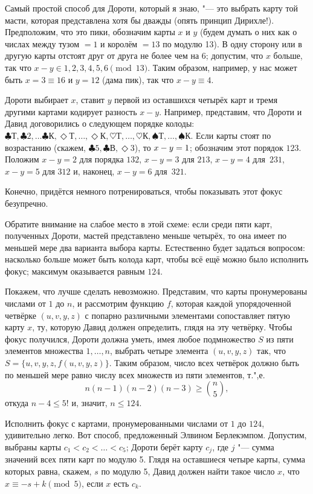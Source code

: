 \documentclass[twoside]{book}
\begin{document}
Самый простой способ для Дороти, который я знаю, "--- это выбрать карту той масти, которая представлена хотя бы дважды (опять принцип Дирихле!).
Предположим, что это пики, обозначим карты $x$ и $y$ (будем думать о них как о числах между тузом $=1$ и королём $=13$ по модулю 13).
В одну сторону или в другую карты отстоят друг от друга не более чем на 6;
допустим, что $x$ больше, так что $x-y\in {1,2,3,4,5,6} \pmod{13}$.
Таким образом, например, у нас может быть $x =3\equiv 16$ и $y = 12$ (дама пик), так что $x-y\equiv4$.

Дороти выбирает $x$, ставит $y$ первой из оставшихся четырёх карт и тремя другими картами кодирует разность $x-y$.
Например, представим, что Дороти и Давид договорились о следующем порядке колоды: 
$\clubsuit\text{Т},
\clubsuit 2,
\dots
\clubsuit\text{К},
\Diamond\text{Т},
\dots,
\Diamond\text{К},
\heartsuit\text{Т},
\dots,
\heartsuit\text{К},
\spadesuit \text{Т},
\dots,
\spadesuit \text{К}$.
Если карты стоят по возрастанию (скажем, 
$\clubsuit 5,
\clubsuit \text{В},
\Diamond 3$), то $x-y\z=1$; обозначим этот порядок $123$.
Положим $x-y=2$ для порядка $132$,
$x-y=3$ для $213$, $x-y=4$ для~$231$, $x-y=5$ для $312$ и, наконец, $x-y=6$ для~$321$.

Конечно, придётся немного потренироваться, чтобы показывать этот фокус безупречно.


Обратите внимание на слабое место в этой схеме: если среди пяти карт, полученных Дороти, мастей представлено меньше четырёх, то она имеет по меньшей мере два варианта выбора карты.
Естественно будет задаться вопросом: насколько больше может быть колода карт, чтобы всё ещё можно было исполнить фокус;
максимум оказывается равным $124$.

Покажем, что лучше сделать невозможно.  Представим, что карты
пронумерованы числами от $1$ до $n$, и
рассмотрим функцию $f$, которая каждой упорядоченной четвёрке
$(u,v,y,z)$ с попарно различными элементами сопоставляет пятую карту
$x$, ту, которую Давид должен определить, глядя на эту четвёрку.
Чтобы фокус получился, Дороти должна уметь, имея любое
подмножество $S$ из пяти элементов множества
${1, \dots, n}$, выбрать четыре элемента $(u,v,y,z)$ так, что
$S = \{u,v,y,z, f(u,v,y,z)\}$.  Таким образом, число всех четвёрок
должно быть по меньшей мере равно числу всех
множеств из пяти элементов, т.",е.
\[n(n - 1)(n - 2)(n - 3)\ge \binom n5,\]
откуда $n - 4 \le5!$ и, значит, $n\le 124$.


Исполнить фокус с картами, пронумерованными числами от $1$
до $124$, удивительно легко.  Вот способ, предложенный Элвином
Берлекэмпом.
Допустим, выбраны карты $c_1 < c_2 < \ldots < c_5$;
Дороти берёт карту $c_j$, где $j$ "--- сумма значений всех пяти карт
по модулю 5.
Глядя на оставшиеся четыре карты, сумма которых равна, скажем, $s$ по модулю 5, Давид должен найти такое число
$x$, что $x\equiv -s + k \pmod 5$, если $x$ есть
$c_k$.
\end{document}
